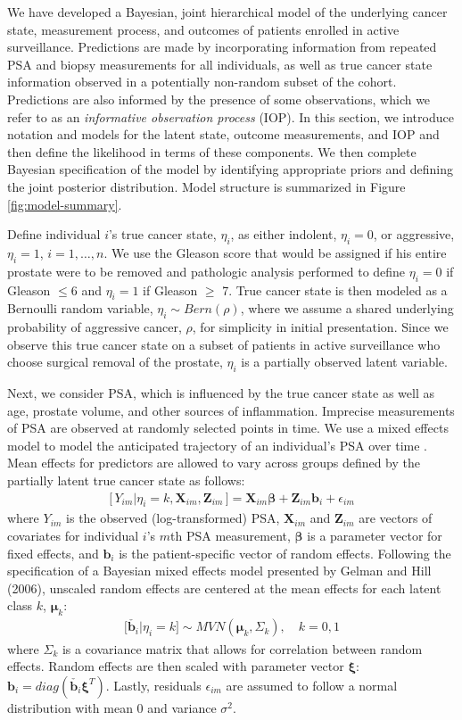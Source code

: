\documentclass[12pt, letterpaper]{article}
\newcommand{\bmbeta}{\boldsymbol{\beta}}
\newcommand{\bmxi}{\boldsymbol{\xi}}
\newcommand{\bmmu}{\boldsymbol{\mu}}
\newcommand{\bmZ}{\mathbf{Z}}
\newcommand{\bmX}{\mathbf{X}}
\newcommand{\bmb}{\mathbf{b}}
\newcommand{\beas}{\begin{eqnarray*}}
\newcommand{\eeas}{\end{eqnarray*}}
\begin{document}
We have developed a Bayesian, joint hierarchical model of the underlying cancer state, measurement process, and outcomes of patients enrolled in active surveillance. Predictions are made by incorporating information from repeated PSA and biopsy measurements for all individuals, as well as true cancer state information observed in a potentially non-random subset of the cohort. Predictions are also informed by the presence of some observations, which we refer to as an \textit{informative observation process} (IOP). In this section, we introduce notation and models for the latent state, outcome measurements, and IOP and then define the likelihood in terms of these components. We then complete Bayesian specification of the model by identifying appropriate priors and defining the joint posterior distribution. Model structure is summarized in Figure \ref{fig:model-summary}.


Define individual $i$'s true cancer state, $\eta_i$, as either indolent, $\eta_i=0$, or aggressive, $\eta_i=1$, $i=1,\dots,n.$ We use the Gleason score that would be assigned if his entire prostate were to be removed and pathologic analysis performed to define $\eta_i=0$ if Gleason $\leq$6 and $\eta_i=1$ if Gleason $\geq$ 7. True cancer state is then modeled as a Bernoulli random variable, $\eta_i \sim Bern(\rho)$, where we assume a shared underlying probability of aggressive cancer, $\rho$, for simplicity in initial presentation. Since we observe this true cancer state on a subset of patients in active surveillance who choose surgical removal of the prostate, $\eta_i$ is a partially observed latent variable. 

Next, we consider PSA, which is influenced by the true cancer state as well as age, prostate volume, and other sources of inflammation. Imprecise measurements of PSA are observed at randomly selected points in time. We use a mixed effects model to model the anticipated trajectory of an individual's PSA over time \cite{Laird1982}. Mean effects for predictors are allowed to vary across groups defined by the partially latent true cancer state as follows: 
\beas
\big[\, Y_{im} | \eta_i=k, \bmX_{im}, \bmZ_{im}\,\big] = \bmX_{im}\bmbeta + \bmZ_{im}\bmb_i + \epsilon_{im}
\eeas
where $Y_{im}$ is the observed (log-transformed) PSA, $\bmX_{im}$ and $\bmZ_{im}$ are vectors of covariates for individual $i$'s $m$th PSA measurement, $\bmbeta$ is a parameter vector for fixed effects, and $\bmb_i$ is the patient-specific vector of random effects. Following the specification of a Bayesian mixed effects model presented by Gelman and Hill (2006)\nocite{Gelman2006}, unscaled random effects are centered at the mean effects for each latent class $k$, $\bmmu_k$:
\beas
\big[\check{\bmb_i} | \eta_i=k\big] \sim MVN ( \bmmu_k, \Sigma_k), \quad k=0,1 
\eeas
where $\Sigma_k$ is a covariance matrix that allows for correlation between random effects. Random effects are then scaled with parameter vector $\bmxi$: $\bmb_i = diag(\check{\bmb_i}\bmxi^T)$. Lastly,
residuals $\epsilon_{im}$ are assumed to follow a normal distribution with mean 0 and variance $\sigma^2$. 
\end{document}
